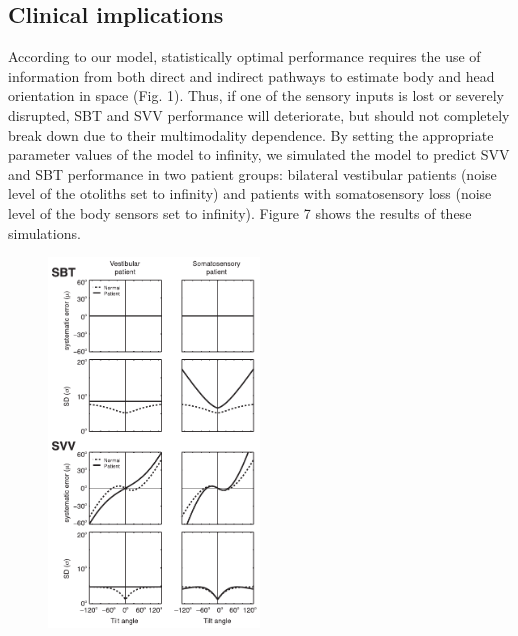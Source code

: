 \subsection{Clinical implications}
 
According to our model, statistically optimal performance requires the use of information from both direct and indirect pathways to estimate body and head orientation in space (Fig. 1). Thus, if one of the sensory inputs is lost or severely disrupted, SBT and SVV performance will deteriorate, but should not completely break down due to their multimodality dependence. By setting the appropriate parameter values of the model to infinity, we simulated the model to predict SVV and SBT performance in two patient groups: bilateral vestibular patients (noise level of the otoliths set to infinity) and patients with somatosensory loss (noise level of the body sensors set to infinity). Figure 7 shows the results of these simulations. 

\begin{figure}
    \includegraphics[width=0.5\textwidth]{src/paper1/figure7.pdf}
\end{figure}

